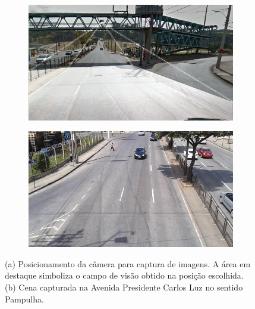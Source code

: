 \begin{figure}[ht]
  \begin{center}
    \begin{subfigure}[b]{.49\textwidth}
      \begin{center}
        \includegraphics[width=1\linewidth]{imgs/cena_captura.png}
      \end{center}
      \caption{}
      \label{fig:cena_captura}
    \end{subfigure}
    \begin{subfigure}[b]{.49\textwidth}
      \begin{center}
        \includegraphics[width=1\linewidth]{imgs/original_frame.png}
      \end{center}
      \caption{}
      \label{fig:original_frame}
    \end{subfigure}
  \end{center}
  \caption{(a) Posicionamento da câmera para captura de imagens. A área em destaque simboliza o campo de visão obtido na posição escolhida. (b) Cena capturada na Avenida Presidente Carlos Luz no sentido Pampulha.}
  \label{fig:cena}
\end{figure}


